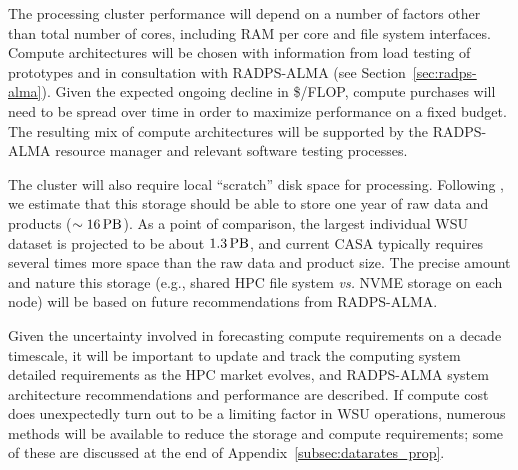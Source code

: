 The processing cluster performance will depend on a number of factors other than total number of cores, including RAM per core and file system interfaces. Compute architectures will be chosen with information from load testing of prototypes and in consultation with RADPS-ALMA (see Section~\ref{sec:radps-alma}).  Given the expected ongoing decline in \$/FLOP, compute purchases will  need to be spread over time in order to maximize performance on a fixed budget. The resulting mix of compute architectures will be supported by the RADPS-ALMA resource manager and relevant software testing processes.


The cluster will also require local ``scratch'' disk space for processing.
Following \cite{computeCostTsi}, we estimate that this storage should be
able to store one year of raw data and products ($\sim 16 \, {\rm PB}$).
As a point of comparison, the largest individual WSU dataset 
is projected to be about $1.3 \, {\rm PB}$, and current CASA typically 
requires several times more space than the raw data and product size.
The precise amount and nature this storage (e.g., shared HPC file
system {\it vs.}  \ac{NVME} storage on each node) will be based on 
future recommendations from RADPS-ALMA.

Given the  uncertainty involved in forecasting compute requirements on a decade timescale, it will be important to update and track the computing 
system detailed requirements as the HPC market evolves, and RADPS-ALMA system architecture recommendations  and performance are described.  If compute cost does unexpectedly turn out to be  a limiting factor in WSU operations, numerous methods will be available  to reduce the storage and compute requirements; some of these are discussed at the end of Appendix~\ref{subsec:datarates_prop}.


\newpage